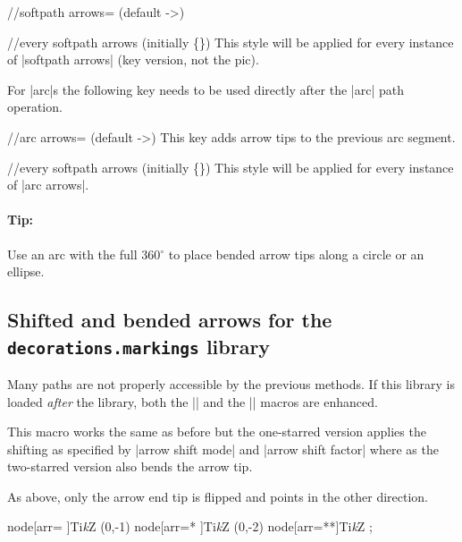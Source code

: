 \begin{multicols}{2}
\begin{key}{/\tikzext/softpath arrows= (default ->)}
\begin{stylekey}{/\tikzext/every softpath arrows (initially \{\})}
This style will be applied for every instance of |softpath arrows| (key version, not the pic).
\end{stylekey}
\end{key}

For |arc|s the following key needs to be used directly after the |arc| path operation.
\begin{key}{/\tikzext/arc arrows= (default ->)}
This key adds arrow tips to the previous arc segment.
\begin{stylekey}{/\tikzext/every softpath arrows (initially \{\})}
This style will be applied for every instance of |arc arrows|.
\end{stylekey}

\paragraph{Tip:}
Use an arc with the full 360${}^\circ$ to place bended arrow tips along a circle or an ellipse.
\end{key}
\subsection{Shifted and bended arrows for the \texttt{decorations.markings} library}
Many paths are not properly accessible by the previous methods.
If this library is loaded \emph{after}
the  library,
both the |\arrow| and
the |\arrowreversed| macros are enhanced.

\begin{command}{\arrow{}}
  This macro works the same as before but the one-starred version
  applies the shifting as specified
  by |arrow shift mode| and |arrow shift factor|
  where as the two-starred version also bends the arrow tip.
\end{command}
\begin{command}{\arrowreversed{}}
  As above, only the arrow end tip is flipped and points in the other direction.
\end{command}
\begin{codeexample}[width=2cm,preamble=\usetikzlibrary{bending, decorations.markings, ext.arrows-plus}]
\tikz[y=1.5cm, >=Stealth, arrows={[round]}, nodes={circle, draw}]
  \path   node[arr=  ]{Ti\emph kZ} %
   (0,-1) node[arr=* ]{Ti\emph kZ} %
   (0,-2) node[arr=**]{Ti\emph kZ} %
  ;
\end{codeexample}
\end{multicols}
\endinput